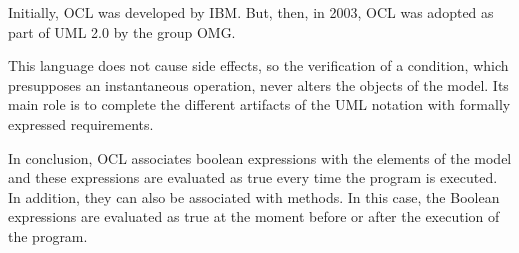 Initially, OCL was developed by IBM. But, then, in 2003, OCL was adopted as part of UML 2.0 by the group OMG.

This language does not cause side effects, so the verification of a condition, which presupposes an instantaneous operation, never alters the objects of the model. Its main role is to complete the different artifacts of the UML notation with formally expressed requirements.

In conclusion, OCL associates boolean expressions with the elements of the model and these expressions are evaluated as true every time the program is executed. In addition, they can also be associated with methods. In this case, the Boolean expressions are evaluated as true at the moment before or after the execution of the program.

















